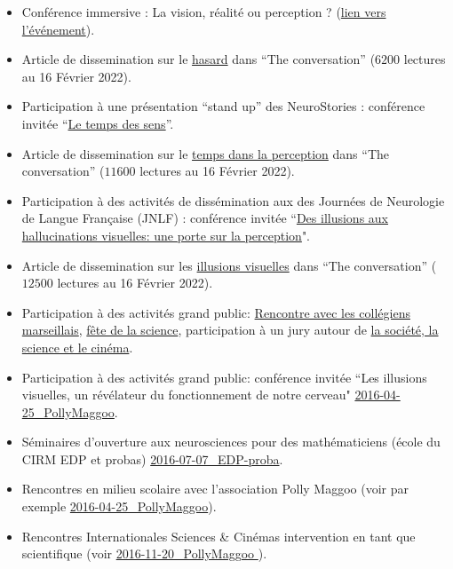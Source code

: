 \documentclass[10pt,french,a4paper,oneside]{article}%
\newcommand{\years}[1]{\marginpar{\textit{\scriptsize #1}}}
\begin{document}
\begin{itemize}
    \item Conférence immersive : \og La vision, réalité ou perception ? \fg{} (\href{https://laurentperrinet.github.io/talk/2025-06-12_explore-conference-immersive}{lien vers l'événement}).


	\item Article de dissemination sur le \href{https://laurentperrinet.github.io/publication/perrinet-21-hasard/}{hasard} dans ``The conversation'' ($6200$ lectures au 16 Février 2022).

	\item Participation à une présentation ``stand up'' des NeuroStories : conférence invitée  ``\href{https://laurentperrinet.github.io/post/2019-10-07_neurostories/}{Le temps des sens}''.

	\item Article de dissemination sur le \href{https://laurentperrinet.github.io/publication/perrinet-19-temps/}{temps dans la perception} dans ``The conversation'' ($11600$ lectures au 16 Février 2022).

	\item Participation à des activités de dissémination aux des Journées de Neurologie de Langue Française (JNLF) : conférence invitée  ``\href{https://laurentperrinet.github.io/talk/2019-04-18-jnlf/}{Des illusions aux hallucinations visuelles: une porte sur la perception}".

	\item Article de dissemination sur les \href{https://theconversation.com/illusions-et-hallucinations-visuelles-une-porte-sur-la-perception-117389}{illusions visuelles} dans ``The conversation'' ($12500$ lectures au 16 Février 2022).

	\item Participation à des activités grand public: \href{https://laurentperrinet.github.io/talk/2019-01-10-polly-maggoo/}{Rencontre avec les collégiens marseillais}, \href{https://laurentperrinet.github.io/talk/2018-10-10-polly-maggoo/}{fête de la science}, participation à un jury autour de \href{https://laurentperrinet.github.io/talk/2017-11-17-festival-interferences/}{la société, la science et le cinéma}.


	
	\item Participation à des activités grand public: conférence invitée\years{2016} ``Les illusions visuelles, un révélateur du fonctionnement de notre cerveau" \url{2016-04-25_PollyMaggoo}.

	\item Séminaires d'ouverture aux neurosciences pour des mathématiciens \years{2016} (école du CIRM EDP et probas)  \url{2016-07-07_EDP-proba}.

	\item Rencontres \years{2015-2016} en milieu scolaire avec l'association Polly Maggoo  (voir par exemple \url{2016-04-25_PollyMaggoo}).

	\item Rencontres Internationales Sciences \& Cinémas\years{2015-2016} intervention en tant que scientifique (voir \url{2016-11-20_PollyMaggoo }).

\end{itemize}
\end{document}
